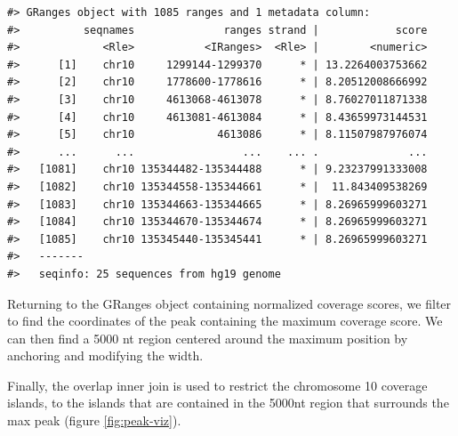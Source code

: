 \documentclass[]{article}
\newenvironment{Shaded}{\begin{snugshade}}{\end{snugshade}}
\newcommand{\DataTypeTok}[1]{\textcolor[rgb]{0.13,0.29,0.53}{#1}}
\newcommand{\DecValTok}[1]{\textcolor[rgb]{0.00,0.00,0.81}{#1}}
\newcommand{\KeywordTok}[1]{\textcolor[rgb]{0.13,0.29,0.53}{\textbf{#1}}}
\newcommand{\NormalTok}[1]{#1}
\newcommand{\OperatorTok}[1]{\textcolor[rgb]{0.81,0.36,0.00}{\textbf{#1}}}
\newcommand{\StringTok}[1]{\textcolor[rgb]{0.31,0.60,0.02}{#1}}
\begin{document}
\begin{verbatim}
#> GRanges object with 1085 ranges and 1 metadata column:
#>          seqnames              ranges strand |            score
#>             <Rle>           <IRanges>  <Rle> |        <numeric>
#>      [1]    chr10     1299144-1299370      * | 13.2264003753662
#>      [2]    chr10     1778600-1778616      * | 8.20512008666992
#>      [3]    chr10     4613068-4613078      * | 8.76027011871338
#>      [4]    chr10     4613081-4613084      * | 8.43659973144531
#>      [5]    chr10             4613086      * | 8.11507987976074
#>      ...      ...                 ...    ... .              ...
#>   [1081]    chr10 135344482-135344488      * | 9.23237991333008
#>   [1082]    chr10 135344558-135344661      * |  11.843409538269
#>   [1083]    chr10 135344663-135344665      * | 8.26965999603271
#>   [1084]    chr10 135344670-135344674      * | 8.26965999603271
#>   [1085]    chr10 135345440-135345441      * | 8.26965999603271
#>   -------
#>   seqinfo: 25 sequences from hg19 genome
\end{verbatim}

Returning to the GRanges object containing normalized coverage scores,
we filter to find the coordinates of the peak containing the maximum
coverage score. We can then find a 5000 nt region centered around the
maximum position by anchoring and modifying the width.

\begin{Shaded}
\end{Shaded}

Finally, the overlap inner join is used to restrict the chromosome 10
coverage islands, to the islands that are contained in the 5000nt region
that surrounds the max peak (figure \ref{fig:peak-viz}).

\begin{Shaded}
\end{Shaded}
\end{document}
